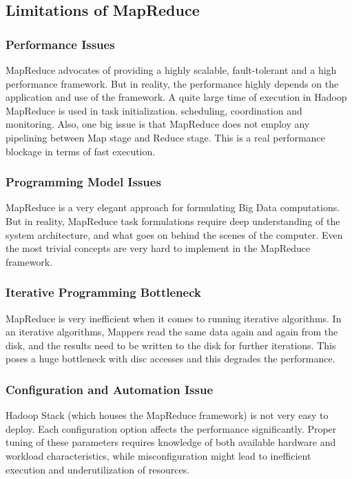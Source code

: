 \documentclass[journal]{IEEEtran}
\begin{document}
\subsection{Limitations of MapReduce}
\subsubsection{Performance Issues}
MapReduce advocates of providing a highly scalable, fault-tolerant and a high performance framework. But in reality, the performance highly depends on the application and use of the framework. A quite large time of execution in Hadoop MapReduce is used in task initialization. scheduling, coordination and monitoring. Also, one big issue is that MapReduce does not employ any pipelining between Map stage and Reduce stage. This is a real performance blockage in terms of fast execution.

\subsubsection{Programming Model Issues}
MapReduce is a very elegant approach for formulating Big Data computations. But in reality, MapReduce task formulations require deep understanding of the system architecture, and what goes on behind the scenes of the computer. Even the most trivial concepts are very hard to implement in the MapReduce framework.

\subsubsection{Iterative Programming Bottleneck}
MapReduce is very inefficient when it comes to running iterative algorithms. In an iterative algorithms, Mappers read the same data again and again from the disk, and the results need to be written to the disk for further iterations. This poses a huge bottleneck with disc accesses and this degrades the performance.

\subsubsection{Configuration and Automation Issue}
Hadoop Stack (which houses the MapReduce framework) is not very easy to deploy. Each configuration option affects the performance significantly.  Proper tuning of these parameters requires knowledge of both available hardware and workload characteristics, while misconfiguration might
lead to inefficient execution and underutilization of resources.
\end{document}
